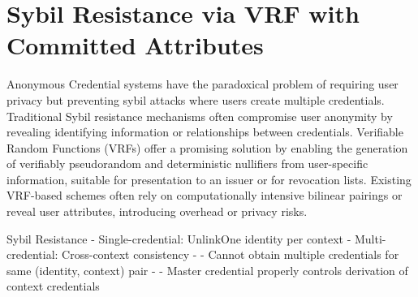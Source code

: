 








































\newpage




\section{Sybil Resistance via VRF with Committed Attributes}
Anonymous Credential systems have the paradoxical problem of requiring user privacy but preventing sybil attacks where users create multiple credentials. Traditional Sybil resistance mechanisms often compromise user anonymity by revealing identifying information or relationships between credentials. Verifiable Random Functions (VRFs) offer a promising solution by enabling the generation of verifiably pseudorandom and deterministic nullifiers from user-specific information, suitable for presentation to an issuer or for revocation lists. Existing VRF-based schemes often rely on computationally intensive bilinear pairings or reveal user attributes, introducing overhead or privacy risks.


Sybil Resistance
- Single-credential: UnlinkOne identity per context
- Multi-credential: Cross-context consistency
- - Cannot obtain multiple credentials for same (identity, context) pair
- - Master credential properly controls derivation of context credentials


